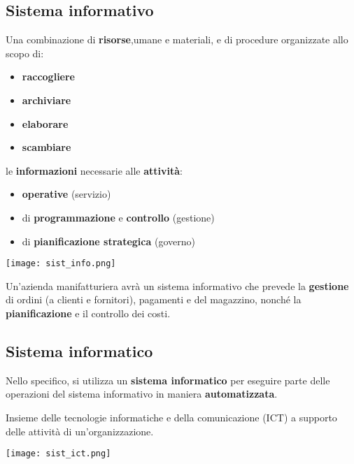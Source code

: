 \subsection{Sistema informativo}
\begin{definition}
	Una combinazione di \textbf{risorse},umane e materiali, e di procedure organizzate allo scopo di:
	\begin{itemize}
		\item \textbf{raccogliere}
		\item \textbf{archiviare}
		\item \textbf{elaborare} 
		\item \textbf{scambiare}
	\end{itemize}
	le \textbf{informazioni} necessarie alle \textbf{attività}:
	\begin{itemize}
		\item \textbf{operative} (servizio)
		\item di \textbf{programmazione} e \textbf{controllo} (gestione)
		\item di \textbf{pianificazione strategica} (governo)
	\end{itemize}
\end{definition}

\begin{center}
	\texttt{[image: sist\_info.png]}
\end{center}

\begin{example}
	Un'azienda manifatturiera avrà un sistema informativo che prevede la \textbf{gestione} di ordini (a clienti e fornitori), pagamenti e del magazzino, nonché la \textbf{pianificazione} e il controllo dei costi.
\end{example}

\subsection{Sistema informatico}
Nello specifico, si utilizza un \textbf{sistema informatico} per eseguire parte delle operazioni del sistema informativo in maniera \textbf{automatizzata}.
\begin{definition}
	Insieme delle tecnologie informatiche e	della comunicazione (ICT) a supporto delle attività di
	un’organizzazione.
\end{definition}

\begin{center}
	\texttt{[image: sist\_ict.png]}
\end{center}
